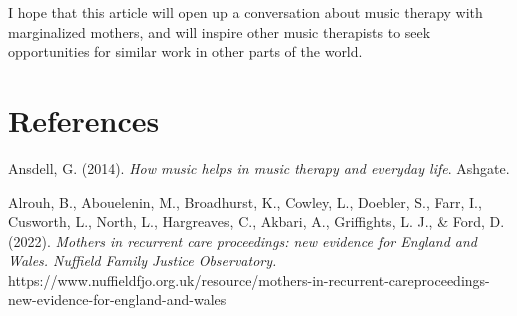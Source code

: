\documentclass[authordate, empirical]{jote-new-article}
\begin{document}
I hope that this article will open up a conversation about music therapy with marginalized mothers, and will inspire other music therapists to seek opportunities for similar work in other parts of the world.

























































\vspace*{\baselineskip}

\section{References}







Ansdell, G. (2014). \emph{How music helps in music therapy and everyday life}. Ashgate.







Alrouh, B., Abouelenin, M., Broadhurst, K., Cowley, L., Doebler, S., Farr, I., Cusworth, L., North, L., Hargreaves, C., Akbari, A., Griffights, L. J., \& Ford, D. (2022). \emph{Mothers in recurrent care proceedings: new evidence for England and Wales. Nuffield Family Justice Observatory.} https://www.nuffieldfjo.org.uk/resource/mothers-in-recurrent-careproceedings-new-evidence-for-england-and-wales
\end{document}
